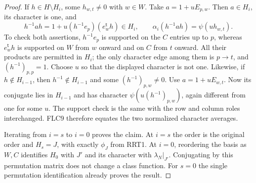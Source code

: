 \begin{proof}
If $h\in H\setminus H_i$, some $h_{w,t}\ne0$ with $w\in W$.
Take $a=1+uE_{p,w}$.  Then $a\in H_i$, its character is one,
and
\[
 h^{-1}ah=1+u(h^{-1}e_p)(e_w^{\mathsf t}h)\in H_i,
 \qquad \alpha_i(h^{-1}ah)=\psi(u h_{w,t}).
\]
To check both assertions, $h^{-1}e_p$ is supported on the
$C$ entries up to $p$, whereas $e_w^{\mathsf t}h$ is supported
on $W$ from $w$ onward and on $C$ from $t$ onward.  All their
products are permitted in $H_i$; the only character edge
among them is $p\to t$, and $(h^{-1})_{p,p}=1$.
Choose $u$ so that the displayed character is not one.
Likewise, if $h\notin H_{i-1}$, then $h^{-1}\notin H_{i-1}$
and some $(h^{-1})_{p,w}\ne0$.  Use $a=1+uE_{w,t}$.
Now its conjugate lies in $H_{i-1}$ and has character
$\psi(u(h^{-1})_{p,w})$, again different from one for some $u$.
The support check is the same with the row and column roles
interchanged.  FLC9 therefore equates the two normalized
character averages.

Iterating from $i=s$ to $i=0$ proves the claim.  At $i=s$ the
order is the original order and $H_s=J$, with exactly
$\phi_J$ from RRT1.  At $i=0$, reordering the basis as $W,C$
identifies $H_0$ with $J'$ and its character with
$\lambda_N|_{J'}$.  Conjugating by this permutation matrix
does not change a class function.  For $s=0$ the single
permutation identification already proves the result.
\end{proof}

